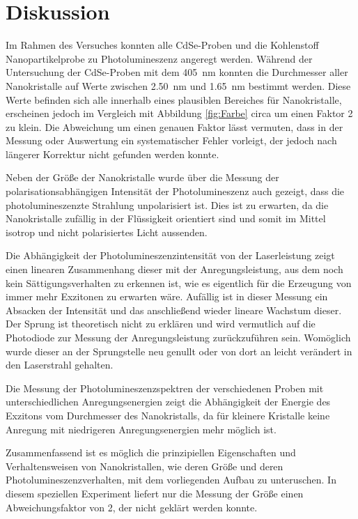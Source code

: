 \newpage
\section{Diskussion}    
    Im Rahmen des Versuches konnten alle CdSe-Proben und die Kohlenstoff Nanopartikelprobe zu Photolumineszenz angeregt werden. Während der Untersuchung der CdSe-Proben mit dem \SI{405}{\nano\metre} konnten
    die Durchmesser aller Nanokristalle auf Werte zwischen \SI{2.50}{\nano\metre} und \SI{1.65}{\nano\metre} bestimmt werden. Diese Werte befinden sich alle innerhalb eines plausiblen Bereiches für 
    Nanokristalle, erscheinen jedoch im Vergleich mit Abbildung \ref{fig:Farbe} circa um einen Faktor 2 zu klein. Die Abweichung um einen genauen Faktor lässt vermuten, dass in der Messung oder Auswertung ein 
    systematischer Fehler vorleigt, der jedoch nach längerer Korrektur nicht gefunden werden konnte. 
    
    Neben der Größe der Nanokristalle wurde über die Messung der polarisationsabhängigen Intensität der Photolumineszenz auch gezeigt, dass die photolumineszenzte Strahlung unpolarisiert ist. Dies ist zu 
    erwarten, da die Nanokristalle zufällig in der Flüssigkeit orientiert sind und somit im Mittel isotrop und nicht polarisiertes Licht aussenden.

    Die Abhängigkeit der Photolumineszenzintensität von der Laserleistung zeigt einen linearen Zusammenhang dieser mit der Anregungsleistung, aus dem noch kein Sättigungsverhalten zu erkennen ist, wie es 
    eigentlich für die Erzeugung von immer mehr Exzitonen zu erwarten wäre. Aufällig ist in dieser Messung ein Absacken der Intensität und das anschließend wieder lineare Wachstum dieser. Der Sprung ist 
    theoretisch nicht zu erklären und wird vermutlich auf die Photodiode zur Messung der Anregungsleistung zurückzuführen sein. Womöglich wurde dieser an der Sprungstelle neu genullt oder von dort an leicht
    verändert in den Laserstrahl gehalten. 
    
    Die Messung der Photolumineszenzspektren der verschiedenen Proben mit unterschiedlichen Anregungsenergien zeigt die Abhängigkeit der Energie des Exzitons vom Durchmesser des Nanokristalls, da für kleinere 
    Kristalle keine Anregung mit niedrigeren Anregungsenergien mehr möglich ist. 

    Zusammenfassend ist es möglich die prinzipiellen Eigenschaften und Verhaltensweisen von Nanokristallen, wie deren Größe und deren Photolumineszenzverhalten, mit dem vorliegenden Aufbau zu unteruschen.
    In diesem speziellen Experiment liefert nur die Messung der Größe einen Abweichungsfaktor von 2, der nicht geklärt werden konnte.  